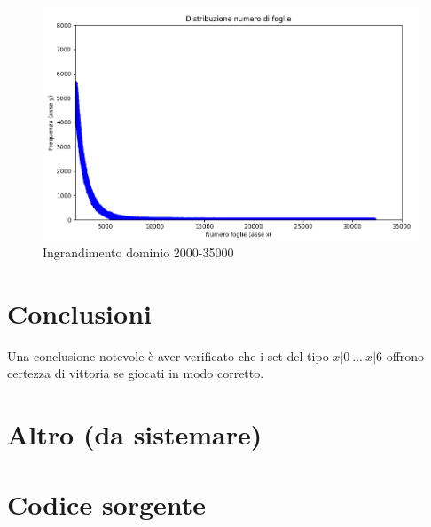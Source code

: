 \documentclass[a4paper,12pt]{report}
\begin{document}
\begin{figure}[h!]
    \centering
    \includegraphics[width=1\textwidth]{imgs/grafico_2000_35000.png} 
    \caption{Ingrandimento dominio 2000-35000}
    \label{fig:etichetta}
\end{figure}




\chapter{Conclusioni}

Una conclusione notevole è aver verificato che i set del tipo \(x|0\ ...\ x|6\) offrono certezza di vittoria se giocati in modo corretto.

\chapter{Altro (da sistemare)}





\appendix
\chapter{Codice sorgente}

\end{document}
